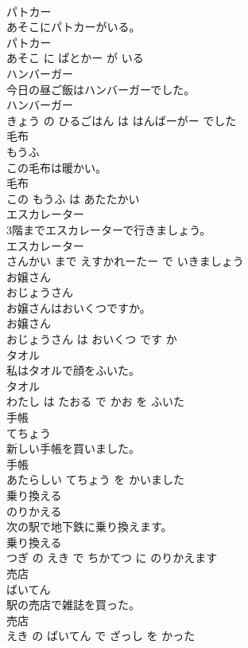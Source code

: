 \documentclass[8pt]{extreport}
\begin{document}
\begin{CJK}{UTF8}{min}
\\	パトカー	
\\	あそこにパトカーがいる。	
\\	パトカー 
\\	あそこ に ぱとかー が いる			
\\	ハンバーガー	
\\	今日の昼ご飯はハンバーガーでした。	
\\	ハンバーガー 
\\	きょう の ひるごはん は はんばーがー でした			
\\	毛布	
\\	もうふ			
\\	この毛布は暖かい。	
\\	毛布 
\\	この もうふ は あたたかい			
\\	エスカレーター	
\\	3階までエスカレーターで行きましょう。	
\\	エスカレーター 
\\	さんかい まで えすかれーたー で いきましょう			
\\	お嬢さん	
\\	おじょうさん			
\\	お嬢さんはおいくつですか。	
\\	お嬢さん 
\\	おじょうさん は おいくつ です か			
\\	タオル	
\\	私はタオルで顔をふいた。	
\\	タオル 
\\	わたし は たおる で かお を ふいた			
\\	手帳	
\\	てちょう			
\\	新しい手帳を買いました。	
\\	手帳 
\\	あたらしい てちょう を かいました			
\\	乗り換える	
\\	のりかえる			
\\	次の駅で地下鉄に乗り換えます。	
\\	乗り換える 
\\	つぎ の えき で ちかてつ に のりかえます			
\\	売店	
\\	ばいてん			
\\	駅の売店で雑誌を買った。	
\\	売店 
\\	えき の ばいてん で ざっし を かった			

\end{CJK}
\end{document}
